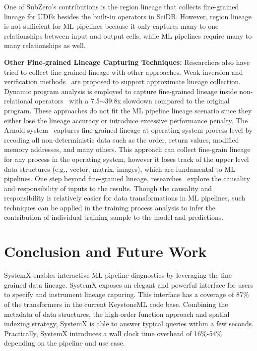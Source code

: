 \documentclass{sig-alternate}
\begin{document}
One of SubZero's contributions is the region lineage that collects fine-grained lineage for UDFs besides the built-in operators in SciDB. 
However, region lineage is not sufficient for ML pipelines because it only captures many to one relationships between input and output cells, 
while ML pipelines require many to many relationships as well.

{\bf Other Fine-grained Lineage Capturing Techniques:} Researchers also have tried to collect fine-grained lineage with other approaches.
Weak inversion and verification methods~\cite{woodruff97} are proposed to support approximate lineage collection.
Dynamic program analysis is employed to capture fine-grained lineage inside non-relational operators~\cite{zhang07} with 
a 7.5$\sim$39.8x slowdown compared to the original program. 
These approaches do not fit the ML pipeline lineage scenario since they either lose the lineage accuracy or introduce
excessive performance penalty.
The Arnold system~\cite{devecsery14} captures fine-grained lineage at operating system process level by recoding
all non-deterministic data such as the order, return values, modified memory addresses, and many others. 
This approach can collect fine-grain lineage for any process in the operating system, however
it loses track of the upper level data structures (e.g., vector, matrix, images), which are fundamental to ML pipelines.
One step beyond fine-grained lineage, researches~\cite{meliou10, meliou11} explore the causality and responsibility
of inputs to the results. Though the causality and responsibility is relatively easier for data transformations in ML pipelines,
such techniques can be applied in the training process analysis to infer the contribution of individual training sample to the 
model and predictions.


\section{Conclusion and Future Work}
\label{sec:Conclusion}
SystemX enables interactive ML pipeline diagnostics by leveraging the fine-grained data lineage.
SystemX exposes an elegant and powerful interface for users to specify and instrument lineage capuring.
This interface has a coverage of 87\% of the transformers in the current KeystoneML code base. 
Combining the metadata of data structures, the high-order function approach and spatial indexing
strategy, SystemX is able to answer typical queries within a few seconds. 
Practically, SystemX introduces a wall clock time overhead of 16\%-54\% depending on the pipeline 
and use case.
\end{document}
